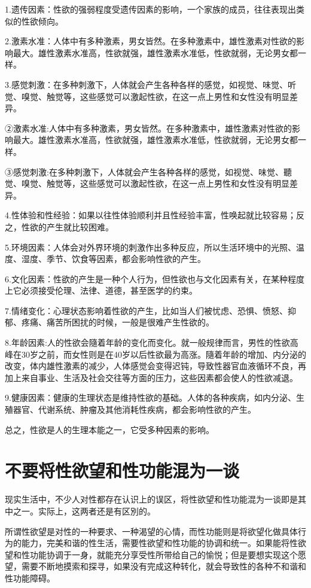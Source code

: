 \documentclass[12pt,UTF8]{ctexbook}
\begin{document}
1.遗传因素：性欲的强弱程度受遗传因素的影响，一个家族的成员，往往表现出类似的性欲倾向。

2.激素水准：人体中有多种激素，男女皆然。在多种激素中，雄性激素对性欲的影响最大。雄性激素水准高，性欲就强，雄性激素水准低，性欲就弱，无论男女都一样。

3.感觉刺激：在多种刺激下，人体就会产生各种各样的感觉，如视觉、味觉、听觉、嗅觉、触觉等，这些感觉可以激起性欲，在这一点上男性和女性没有明显差异。

②激素水准:人体中有多种激素，男女皆然。在多种激素中，雄性激素对性欲的影响最大。雄性激素水准高，性欲就强，雄性激素水准低，性欲就弱，无论男女都一样。

③感觉刺激:在多种刺激下，人体就会产生各种各样的感觉，如视觉、味觉、聽觉、嗅觉、触觉等，这些感觉可以激起性欲，在这一点上男性和女性没有明显差异。

4.性体验和性经验：如果以往性体验顺利并且性经验丰富，性唤起就比较容易；反之，性欲的产生就比较困难。

5.环境因素：人体会对外界环境的刺激作出多种反应，所以生活环境中的光照、温度、湿度、季节、饮食等因素，都会影响性欲的产生。

6.文化因素：性欲的产生是一种个人行为，但性欲也与文化因素有关，在某种程度上它必须接受伦理、法律、道德，甚至医学的约束。

7.情绪变化：心理状态影响着性欲的产生，比如当人们被忧虑、恐惧、愤怒、抑郁、疼痛、痛苦所困扰的时候，一般是很难产生性欲的。

8.年龄因素:人的性欲会隨着年龄的变化而变化。就一般规律而言，男性的性欲高峰在30岁之前，而女性则是在40岁以后性欲最为高涨。隨着年龄的增加、内分泌的改变，体内雄性激素的减少，人体感觉会变得迟钝，导致性器官血液循环不良，再加上来自事业、生活及社会交往等方面的压力，这些因素都会使人的性欲减退。

9.健康因素：健康的生理状态是维持性欲的基础。人体的各种疾病，如内分泌、生殖器官、代谢系统、肿瘤及其他消耗性疾病，都会影响性欲的产生。

总之，性欲是人的生理本能之一，它受多种因素的影响。

\chapter{不要将性欲望和性功能混为一谈}

现实生活中，不少人对性都存在认识上的误区，将性欲望和性功能混为一谈即是其中之一。实际上，这两者还是有区別的。

所谓性欲望是对性的一种要求、一种渴望的心情，而性功能则是将欲望化做具体行为的能力，完美和谐的性生活，需要性欲望和性功能的协调和统一。如果能将性欲望和性功能协调于一身，就能充分享受性所带给自己的愉悦；但是要想实现这个愿望，需要不断地摸索和探寻，如果没有完成这种转化，就会导致性的各种不和谐和性功能障碍。
\end{document}
